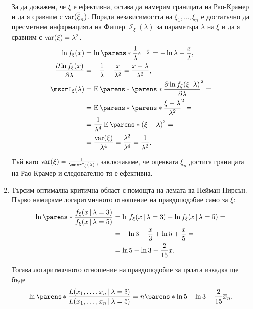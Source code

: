 \documentclass{../../common/topic}
\begin{document}
\begin{solution}
\begin{enumerate}[label=\alph*)]
    За да докажем, че \( \xi \) е ефективна, остава да намерим границата на Рао-Крамер и да я сравним с \( \operatorname{var}(\overline \xi_n) \). Поради независимостта на \( \xi_1, \ldots, \xi_n \) е достатъчно да пресметнем информацията на Фишер \( \mscrI_\xi(\lambda) \) за параметъра \( \lambda \) на \( \xi \) и да я сравним с \( \operatorname{var}(\xi) = \lambda^2 \).
    \begin{align*}
      \ln f_\xi(x)
      &=
      \ln \parens*{\frac 1 \lambda e^{-\frac x \lambda} }
      =
      -\ln \lambda -\frac x \lambda,
      \\
      \frac {\partial \ln f_\xi(x)} {\partial \lambda}
      &=
      -\frac 1 \lambda + \frac x {\lambda^2}
      =
      \frac {x - \lambda} {\lambda^2},
      \\
      \mscrI_\xi(\lambda)
      &=
      \Expect \parens*{ {\parens*{ \frac {\partial \ln f_\xi(\xi \given \lambda)} {\partial \lambda} }}^2 }
      = \\ &=
      \Expect \parens*{ {\parens*{ \frac {\xi - \lambda} {\lambda^2} }}^2 }
      = \\ &=
      \frac 1 {\lambda^4} \Expect \parens*{ {({\xi - \lambda})}^2 }
      = \\ &=
      \frac {\var(\xi)} {\lambda^4}
      =
      \frac {\lambda^2} {\lambda^4}
      =
      \frac 1 {\lambda^2}.
    \end{align*}

    Тъй като \( \var(\xi) = \frac 1 {\mscrI_\xi(\lambda)} \), заключаваме, че оценката \( \overline \xi_n \) достига границата на Рао-Крамер и следователно тя е ефективна.

    \item Търсим оптимална критична област с помощта на лемата на Нейман-Пирсън. Първо намираме логаритмичното отношение на правдоподобие само за \( \xi \):
    \begin{align*}
      \ln \parens*{\frac {f_\xi(x \given \lambda=3)} {f_\xi(x \given \lambda=5)} }
      &=
      \ln f_\xi(x \given \lambda=3) - \ln f_\xi(x \given \lambda=5)
      = \\ &=
      - \ln 3 - \frac x 3 + \ln 5 + \frac x 5
      = \\ &=
      \ln 5 - \ln 3 - \frac 2 {15} x.
    \end{align*}

    Тогава логаритмичното отношение на правдоподобие за цялата извадка ще бъде
    \begin{equation*}
      \ln \parens*{\frac {L(x_1, \ldots, x_n \given \lambda=3)} {L(x_1, \ldots, x_n \given \lambda=5)} }
      =
      n \parens*{\ln 5 - \ln 3 - \frac 2 {15} \overline x_n }.
    \end{equation*}


\end{enumerate}
\end{solution}
\end{document}

